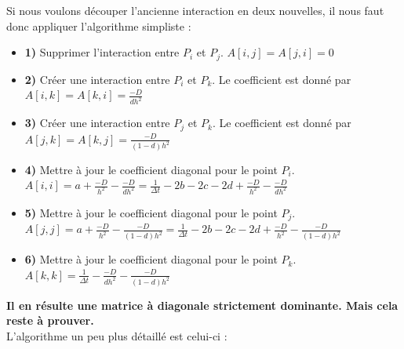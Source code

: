 \documentclass[11pt,a4paper]{article}
\begin{document}
Si nous voulons découper l'ancienne interaction en deux nouvelles, il nous faut donc appliquer l'algorithme simpliste :
\begin{itemize}
\item \textbf{1)} Supprimer l'interaction entre $P_i$ et $P_j$. $A [i, j]= A [j, i] = 0$\\
\item \textbf{2)} Créer une interaction entre $P_i$ et $P_k$. Le coefficient est donné par $A [i, k] = A [k, i] = \frac{-D}{dh^2}$\\
\item \textbf{3)} Créer une interaction entre $P_j$ et $P_k$. Le coefficient est donné par $A [j, k] = A [k, j] = \frac{-D}{(1-d)h^2}$\\
\item \textbf{4)} Mettre à jour le coefficient diagonal pour le point $P_i$.\\
$A [i, i] = a + \frac{-D}{h^2} - \frac{-D}{dh^2} = \frac{1}{\Delta t} -2b -2c -2d + \frac{-D}{h^2} - \frac{-D}{dh^2}$\\
\item \textbf{5)} Mettre à jour le coefficient diagonal pour le point $P_j$.\\
$A [j, j] = a + \frac{-D}{h^2} - \frac{-D}{(1-d)h^2} = \frac{1}{\Delta t} -2b -2c -2d + \frac{-D}{h^2} - \frac{-D}{(1-d)h^2}$\\
\item \textbf{6)} Mettre à jour le coefficient diagonal pour le point $P_k$.\\
$A [k, k] = \frac{1}{\Delta t} - \frac{-D}{dh^2} - \frac{-D}{(1-d)h^2}$
\end{itemize}\vspace{15mm}
\textbf{Il en résulte une matrice à diagonale strictement dominante. Mais cela reste à prouver.}\vspace{10mm}\\
\newpage
L'algorithme un peu plus détaillé est celui-ci :\\
\end{document}

